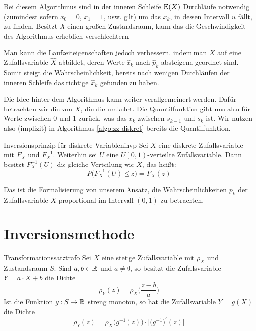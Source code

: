 Bei diesem Algorithmus sind in der inneren Schleife $\operatorname{E}(X)$ Durchläufe
notwendig (zumindest sofern $x_0 = 0$, $x_1=1$, usw. gilt)
um das $x_k$, in dessen Intervall $u$ fällt, zu finden.
Besitzt $X$ einen großen Zustandsraum, kann das die Geschwindigkeit des
Algorithmus erheblich verschlechtern.

Man kann die Laufzeiteigenschaften jedoch
verbessern, indem man $X$ auf eine Zufallsvariable $\hat{X}$ abbildet, deren
Werte $\hat{x}_k$ nach $\hat{p}_k$ absteigend geordnet sind. Somit steigt die
Wahrscheinlichkeit, bereits nach wenigen Durchläufen der inneren Schleife das
richtige $\hat{x}_k$ gefunden zu haben.

Die Idee hinter dem Algorithmus kann weiter verallgemeinert werden. Dafür
betrachten wir die  von $X$, die die
 umkehrt. Die Quantilfunktion gibt
uns also für Werte zwischen $0$ und $1$ zurück, was das $x_k$ zwischen $s_{k-1}$
und $s_k$ ist. Wir nutzen also (implizit) in Algorithmus \ref{algo:zz-diskret}
bereits die Quantilfunktion.

\begin{theorem}{Inversionsprinzip für diskrete Variablen}{invp}
Sei $X$ eine diskrete Zufallsvariable mit 
$F_X$ und 
$F_X^{-1}$. Weiterhin sei $U$ eine $U(0,1)$-verteilte Zufallsvariable. Dann
besitzt $F_X^{-1}(U)$ die gleiche Verteilung wie $X$, das heißt:
\[
P\big(F_X^{-1}(U)\le z\big) = F_X(z)
\]
\end{theorem}
Das ist die Formalisierung von unserem Ansatz, die Wahrscheinlichkeiten $p_k$
der Zufallsvariable $X$ proportional im Intervall $(0,1)$ zu betrachten.

\section{Inversionsmethode}\label{algo:inv-methode}

\begin{theorem}{Transformationssatz}{trafo}
Sei $X$ eine stetige Zufallsvariable mit  $\rho_X$ und
Zustandsraum $S$. Sind $a,b\in\mathbb{R}$ und $a \ne 0$, so besitzt die Zufallsvariable
$Y = a\cdot X + b$ die Dichte
\[
\rho_Y(z) = \rho_X\Big(\frac{z-b}{a}\Big)
\]
Ist die Funktion $g:S\to\mathbb{R}$ streng monoton, so hat die Zufallsvariable $Y=g(X)$
die Dichte
\[
\rho_Y(z) = \rho_X\big(g^{-1}(z)\big)\cdot\big|\big(g^{-1}\big)^\prime(z)\big|
\]
\end{theorem}

